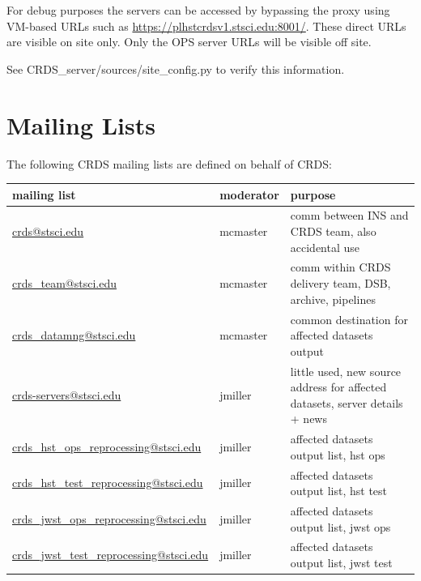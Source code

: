 \documentclass[letterpaper,10pt,english]{sphinxmanual}
\begin{document}
For debug purposes the servers can be accessed by bypassing the proxy using VM-based URLs such
as \href{https://plhstcrdsv1.stsci.edu:8001/}{https://plhstcrdsv1.stsci.edu:8001/}.  These direct URLs are visible on site only.  Only the OPS
server URLs will be visible off site.

See CRDS\_server/sources/site\_config.py to verify this information.


\chapter{Mailing Lists}
\label{server_guide:mailing-lists}
The following CRDS mailing lists are defined on behalf of CRDS:

\begin{tabulary}{\linewidth}{|L|L|L|}
\hline
\textsf{\relax 
mailing list
} & \textsf{\relax 
moderator
} & \textsf{\relax 
purpose
}\\
\hline
\href{mailto:crds@stsci.edu}{crds@stsci.edu}
 & 
mcmaster
 & 
comm between INS and CRDS team, also accidental use
\\

\href{mailto:crds\_team@stsci.edu}{crds\_team@stsci.edu}
 & 
mcmaster
 & 
comm within CRDS delivery team, DSB, archive, pipelines
\\

\href{mailto:crds\_datamng@stsci.edu}{crds\_datamng@stsci.edu}
 & 
mcmaster
 & 
common destination for affected datasets output
\\

\href{mailto:crds-servers@stsci.edu}{crds-servers@stsci.edu}
 & 
jmiller
 & 
little used,  new source address for affected datasets,  server details + news
\\

\href{mailto:crds\_hst\_ops\_reprocessing@stsci.edu}{crds\_hst\_ops\_reprocessing@stsci.edu}
 & 
jmiller
 & 
affected datasets output list, hst ops
\\

\href{mailto:crds\_hst\_test\_reprocessing@stsci.edu}{crds\_hst\_test\_reprocessing@stsci.edu}
 & 
jmiller
 & 
affected datasets output list, hst test
\\

\href{mailto:crds\_jwst\_ops\_reprocessing@stsci.edu}{crds\_jwst\_ops\_reprocessing@stsci.edu}
 & 
jmiller
 & 
affected datasets output list, jwst ops
\\

\href{mailto:crds\_jwst\_test\_reprocessing@stsci.edu}{crds\_jwst\_test\_reprocessing@stsci.edu}
 & 
jmiller
 & 
affected datasets output list, jwst test
\\
\hline\end{tabulary}
\end{document}
